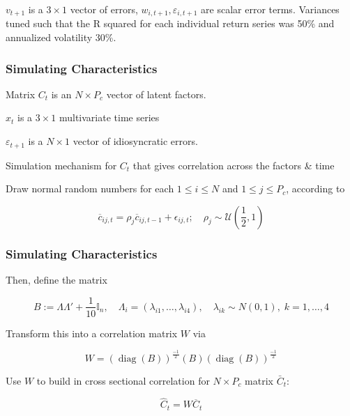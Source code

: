 \documentclass[]{beamer}
\begin{document}
\begin{frame}
\begin{frame}
$v_{t+1}$ is a $3\times 1$ vector of errors, $w_{i,t+1},\varepsilon_{i,t+1}$ are scalar error terms. Variances tuned such that the R squared for each individual return series was 50\% and annualized volatility 30\%.

\end{frame}

\begin{frame}
\frametitle{Simulating Characteristics}

Matrix $C_t$ is an $N\times P_c$ vector of latent factors. 

$x_t$ is a $3 \times 1$ multivariate time series

$\varepsilon_{t+1}$ is a $N\times 1$ vector of idiosyncratic errors. 

Simulation mechanism for $C_t$ that gives correlation across the factors \& time

Draw normal random numbers for each $1\leq i\leq N$ and $1\leq j\leq P_{c}$, according to 

\begin{equation}
\overline{c}_{i j, t} = \rho_{j} \overline{c}_{i j, t-1}+\epsilon_{i j, t} ;
\quad \rho_{j} \sim \mathcal{U} \left( \frac{1}{2},1 \right) 
\end{equation}

\end{frame}

\begin{frame}
\frametitle{Simulating Characteristics}
Then, define the matrix 

\begin{equation}
B:=\Lambda\Lambda' + \frac{1}{10}\mathbb{I}_{n}, \quad
\Lambda_i = (\lambda_{i1},\dots,\lambda_{i4}), \quad
\lambda_{ik}\sim N(0,1), \; k=1,\dots,4
\end{equation}

Transform this into a correlation matrix $W$ via

\begin{equation}
W = \left( \operatorname{diag}(B) \right) ^{\frac{-1}{2}}
(B)
\left( \operatorname{diag}(B) \right) ^{\frac{-1}{2}}
\end{equation}

Use $W$ to build in cross sectional correlation for $N\times P_{c}$ matrix $\bar{C}_t$:

\begin{equation}
\widehat{C}_{t}=W\overline{C}_{t}
\end{equation}
\end{frame}


\end{frame}
\end{document}
